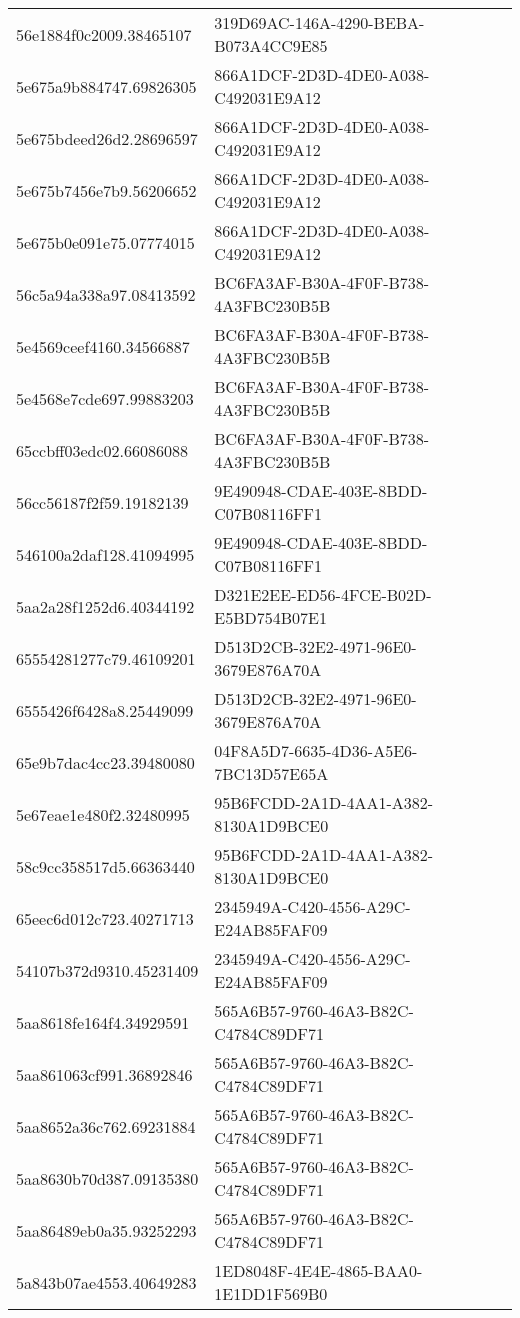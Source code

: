 \begin{tabular}{ll}
56e1884f0c2009.38465107 & 319D69AC-146A-4290-BEBA-B073A4CC9E85 \\
5e675a9b884747.69826305 & 866A1DCF-2D3D-4DE0-A038-C492031E9A12 \\
5e675bdeed26d2.28696597 & 866A1DCF-2D3D-4DE0-A038-C492031E9A12 \\
5e675b7456e7b9.56206652 & 866A1DCF-2D3D-4DE0-A038-C492031E9A12 \\
5e675b0e091e75.07774015 & 866A1DCF-2D3D-4DE0-A038-C492031E9A12 \\
56c5a94a338a97.08413592 & BC6FA3AF-B30A-4F0F-B738-4A3FBC230B5B \\
5e4569ceef4160.34566887 & BC6FA3AF-B30A-4F0F-B738-4A3FBC230B5B \\
5e4568e7cde697.99883203 & BC6FA3AF-B30A-4F0F-B738-4A3FBC230B5B \\
65ccbff03edc02.66086088 & BC6FA3AF-B30A-4F0F-B738-4A3FBC230B5B \\
56cc56187f2f59.19182139 & 9E490948-CDAE-403E-8BDD-C07B08116FF1 \\
546100a2daf128.41094995 & 9E490948-CDAE-403E-8BDD-C07B08116FF1 \\
5aa2a28f1252d6.40344192 & D321E2EE-ED56-4FCE-B02D-E5BD754B07E1 \\
65554281277c79.46109201 & D513D2CB-32E2-4971-96E0-3679E876A70A \\
6555426f6428a8.25449099 & D513D2CB-32E2-4971-96E0-3679E876A70A \\
65e9b7dac4cc23.39480080 & 04F8A5D7-6635-4D36-A5E6-7BC13D57E65A \\
5e67eae1e480f2.32480995 & 95B6FCDD-2A1D-4AA1-A382-8130A1D9BCE0 \\
58c9cc358517d5.66363440 & 95B6FCDD-2A1D-4AA1-A382-8130A1D9BCE0 \\
65eec6d012c723.40271713 & 2345949A-C420-4556-A29C-E24AB85FAF09 \\
54107b372d9310.45231409 & 2345949A-C420-4556-A29C-E24AB85FAF09 \\
5aa8618fe164f4.34929591 & 565A6B57-9760-46A3-B82C-C4784C89DF71 \\
5aa861063cf991.36892846 & 565A6B57-9760-46A3-B82C-C4784C89DF71 \\
5aa8652a36c762.69231884 & 565A6B57-9760-46A3-B82C-C4784C89DF71 \\
5aa8630b70d387.09135380 & 565A6B57-9760-46A3-B82C-C4784C89DF71 \\
5aa86489eb0a35.93252293 & 565A6B57-9760-46A3-B82C-C4784C89DF71 \\
5a843b07ae4553.40649283 & 1ED8048F-4E4E-4865-BAA0-1E1DD1F569B0 \\

\end{tabular}
